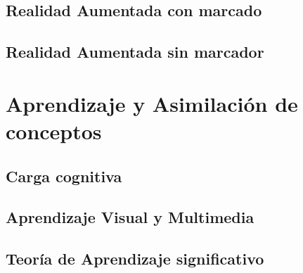 \subsection{Realidad Aumentada con marcado}

\subsection{Realidad Aumentada sin marcador}

\section{Aprendizaje y Asimilación de conceptos}

\subsection{Carga cognitiva}

\subsection{Aprendizaje Visual y Multimedia}

\subsection{Teoría de Aprendizaje significativo}